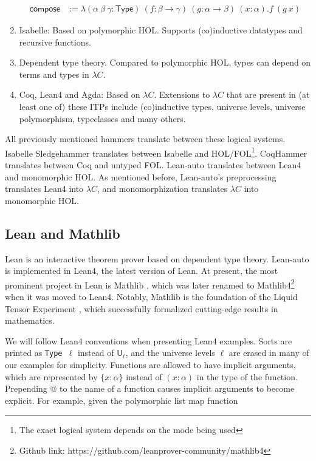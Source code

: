 \begin{enumerate}
$$\begin{aligned}
      \mathsf{compose} & := \lambda (\alpha \ \beta \ \gamma : \mathsf{Type}) \ (f : \beta \to \gamma) \ (g : \alpha \to \beta) \ (x : \alpha). f \ (g \ x)
      \end{aligned}$$
    \item Isabelle: Based on polymorphic HOL. Supports (co)inductive datatypes and recursive functions.
    \item Dependent type theory. Compared to polymorphic HOL, types can depend on terms and types in $\lambda C$.
    \item Coq, Lean4 and Agda: Based on $\lambda C$. Extensions to $\lambda C$ that are
      present in (at least one of) these ITPs include (co)inductive types, universe levels,
      universe polymorphism, typeclasses and many others.
  \end{enumerate}
  
  \noindent All previously mentioned hammers translate between these logical systems. Isabelle
  Sledgehammer translates between Isabelle and
  HOL/FOL\footnote{The exact logical system depends on the mode being used}.
  CoqHammer translates between Coq and untyped FOL. Lean-auto translates
  between Lean4 and monomorphic HOL. As mentioned before, Lean-auto's
  preprocessing translates Lean4 into $\lambda C$, and monomorphization
  translates $\lambda C$ into monomorphic HOL.

\subsection{Lean and Mathlib}\label{sectlean}

  Lean is an interactive theorem prover based on dependent type theory. Lean-auto
  is implemented in Lean4, the latest version of Lean. At present, the
  most prominent project in Lean is Mathlib \cite{MathlibPaper},
  which was later renamed to Mathlib4\footnote{Github link: https://github.com/leanprover-community/mathlib4}
  when it was moved to Lean4. Notably, Mathlib is the foundation of the
  Liquid Tensor Experiment \cite{LiquidTensor}, which successfully
  formalized cutting-edge results in mathematics. 

  We will follow Lean4 conventions when presenting Lean4 examples. Sorts are
  printed as \texttt{Type $\ell$} instead of $\mathsf{U}_\ell$, and the universe levels $\ell$
  are erased in many of our examples for simplicity.
  Functions are allowed to have implicit arguments, which are represented by
  $\{x : \alpha\}$ instead of $(x : \alpha)$ in the type of the function.
  Prepending \textrm{@} to the name of a function causes implicit arguments
  to become explicit. For example, given the polymorphic list map function


